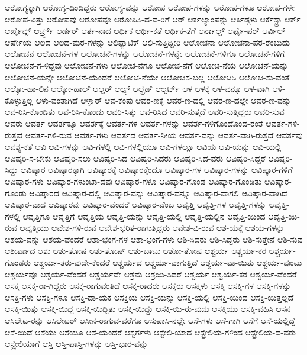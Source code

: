 {ಆರೋಗ್ಯಕ್ಕಾಗಿ
ಆರೋಗ್ಯ-ದಿಂದಿದ್ದರು
ಆರೋಗ್ಯ-ವನ್ನು
ಆರೋಪ
ಆರೋಪ-ಗಳನ್ನು
ಆರೋಪ-ಗಳೂ
ಆರೋಪ-ಗಳೇ
ಆರೋಪ-ವಿತ್ತು
ಆರೋಪವು
ಆರೋಪವೂ
ಆರೋಪಿಸಿ-ದ-ವ-ರಿಗೆ
ಆರ್
ಆರ್ಕಲ್ಯಾಂಪನ್ನು
ಆರ್ಕಿಡ್ಗಳು
ಆರ್ಕೆಸ್ಟ್ರಾ
ಆರ್ಕ್
ಆರ್ಖೈವ್ಸ್
ಆರ್ಚ್ರ್ಡ್
ಆರ್ಡರ್
ಆರ್ತ-ನಾದ
ಆರ್ಥಿಕ
ಆರ್ಥಿ-ಕತೆ
ಆರ್ಥಿಕ-ತೆಗೆ
ಆರ್ನಾಲ್ಡ್
ಆರ್ಫೈ-ಪರ್
ಆರ್ವಿಲ್
ಆರ್ಷೇಯ
ಆಲದ
ಆಲದ-ಮರ-ಗಳನ್ನು
ಆಲಿಫ್ಯಾಟಿಕ್
ಆಲಿ-ಸುತ್ತಿದ್ದೀರಿ
ಆಲೋಚನಾ
ಆಲೋಚನಾ-ಪರ-ರೆಂಬುದು
ಆಲೋಚನೆ
ಆಲೋಚನೆ-ಗಳ
ಆಲೋಚನೆ-ಗಳನ್ನು
ಆಲೋಚನೆ-ಗಳನ್ನೇ
ಆಲೋಚನೆ-ಗಳಿಗೂ
ಆಲೋಚನೆ-ಗಳಿಗೆ
ಆಲೋಚನೆ-ಗ-ಳಿದ್ದವು
ಆಲೋಚನೆ-ಗಳು
ಆಲೋಚ-ನೆಗೂ
ಆಲೋಚ-ನೆಗೆ
ಆಲೋಚ-ನೆಯ
ಆಲೋಚನೆ-ಯನ್ನು
ಆಲೋಚನೆ-ಯನ್ನೇ
ಆಲೋಚನೆ-ಯೆಂದರೆ
ಆಲೋಚ-ನೆಯೇ
ಆಲೋಚಿಸ-ಬಲ್ಲ
ಆಲೋಚಿಸಿ
ಆಲೋಚಿ-ಸು-ವಂತೆ
ಆಲ್ಕೋ-ಹಾ-ಲಿನ
ಆಲ್ಕೋ-ಹಾಲ್
ಆಲ್ಡರ್
ಆಲ್ಪ್ಸ್
ಆಲ್ಫ್ರೆಡ್
ಆಲ್ಬರ್ಟ್
ಆಳ
ಆಳಕ್ಕೆ
ಆಳ-ವನ್ನೂ
ಆಳ-ವಾಗಿ
ಆಳಿ-ಕೊಳ್ಳುತ್ತಿಲ್ಲ
ಆಳು-ವಂತಾಗಿದೆ
ಆಳ್ವಾರ್
ಆವ-ಕೆಂಪು
ಆವರ-ಣಕ್ಕೆ
ಆವರ-ಣ-ದಲ್ಲಿ
ಆವರ-ಣ-ದಲ್ಲೇ
ಆವರ-ಣ-ವನ್ನು
ಆವ-ರಿಸಿ-ಕೊಂಡಿತು
ಆವ-ರಿಸಿ-ಕೊಂಡು
ಆವರಿ-ಸಿತ್ತು
ಆವ-ರಿಸಿದ
ಆವರಿ-ಸುತ್ತದೆ
ಆವರಿ-ಸುತ್ತಿದ್ದರು
ಆವರಿ-ಸುವ
ಆವರು
ಆವರ್ತ
ಆವರ್ತಕ್ಕೂ
ಆವರ್ತಕ್ಕೆ
ಆವರ್ತ-ಗಳ
ಆವರ್ತ-ಗಳನ್ನು
ಆವರ್ತ-ಗಳಿಗೊಂದೊಂದ-ರಂತೆ
ಆವರ್ತ-ಗಳಿ-ರುತ್ತವೆ
ಆವರ್ತ-ಗಳಿ-ರುವ
ಆವರ್ತ-ಗಳು
ಆವರ್ತದ
ಆವರ್ತ-ನೀಯ
ಆವರ್ತ-ವನ್ನು
ಆವರ್ತ-ವಾಗಿ-ರುತ್ತದೆ
ಆವರ್ತವು
ಆವಶ್ಯ-ಕತೆ
ಆವಿ
ಆವಿ-ಗಳನ್ನು
ಆವಿ-ಗಳಲ್ಲಿ
ಆವಿ-ಗಳಲ್ಲಿಯೂ
ಆವಿ-ಗಳಲ್ಲೂ
ಆವಿಯ
ಆವಿ-ಯನ್ನು
ಆವಿ-ಯಲ್ಲಿ
ಆವಿಷ್ಕರಿ-ಸ-ಬೇಕು
ಆವಿಷ್ಕರಿ-ಸಲು
ಆವಿಷ್ಕರಿ-ಸಿದ
ಆವಿಷ್ಕರಿ-ಸಿದರು
ಆವಿಷ್ಕರಿ-ಸಿದ-ವರು
ಆವಿಷ್ಕರಿ-ಸಿದ್ದರೆ
ಆವಿಷ್ಕರಿ-ಸಿದ್ದು
ಆವಿಷ್ಕಾರ
ಆವಿಷ್ಕಾರಕ್ಕಾಗಿ
ಆವಿಷ್ಕಾರಕ್ಕೆ
ಆವಿಷ್ಕಾರಕ್ಕೆಂದೂ
ಆವಿಷ್ಕಾರ-ಗಳ
ಆವಿಷ್ಕಾರ-ಗಳನ್ನು
ಆವಿಷ್ಕಾರ-ಗಳಿಗೆ
ಆವಿಷ್ಕಾರ-ಗಳು
ಆವಿಷ್ಕಾರ-ಗಳುಂಟಾ-ದವು
ಆವಿಷ್ಕಾರ-ಗಳೂ
ಆವಿಷ್ಕಾರ-ಗೊಂಡ
ಆವಿಷ್ಕಾರ-ಗೊಂಡಿತು
ಆವಿಷ್ಕಾರ-ಗೊಂಡು
ಆವಿಷ್ಕಾರದ
ಆವಿಷ್ಕಾರ-ದಲ್ಲಿ
ಆವಿಷ್ಕಾರ-ವನ್ನು
ಆವಿಷ್ಕಾರ-ವನ್ನೂ
ಆವಿಷ್ಕಾರ-ವಾಗಲಿ
ಆವಿಷ್ಕಾರ-ವಾಗಿದೆ
ಆವಿಷ್ಕಾರ-ವಾದ
ಆವಿಷ್ಕಾರವು
ಆವಿಷ್ಕಾರ-ವೆಂದರೆ
ಆವಿಷ್ಕಾರ-ವೆಂಬ
ಆವೃತ್ತಿ
ಆವೃತ್ತಿ-ಗಳ
ಆವೃತ್ತಿ-ಗಳನ್ನು
ಆವೃತ್ತಿ-ಗಳಲ್ಲಿ
ಆವೃತ್ತಿಗೂ
ಆವೃತ್ತಿಗೆ
ಆವೃತ್ತಿಯ
ಆವೃತ್ತಿ-ಯನ್ನು
ಆವೃತ್ತಿ-ಯಲ್ಲಿ
ಆವೃತ್ತಿ-ಯಲ್ಲಿನ
ಆವೃತ್ತಿ-ಯಿಂದ
ಆವೃತ್ತಿ-ಯಿ-ರುವ
ಆವೃತ್ತಿಯು
ಆವೇಶ-ಗಳಿ-ರುವ
ಆವೇಶ-ಭರಿತ-ರಾಗುತ್ತಿದ್ದರು
ಆವೇಶ-ವಿ-ರುವ
ಆಶ-ಯಕ್ಕೆ
ಆಶಯ-ಗಳನ್ನು
ಆಶಯ-ವನ್ನು
ಆಶಯ-ವೆಂದರೆ
ಆಶಾ-ಭಂಗ-ಗಳ
ಆಶಾ-ಭಂಗ-ಗಳು
ಆಶಿ-ಸಿದರು
ಆಶಿ-ಸಿದ್ದರು
ಆಶಿ-ಸುತ್ತೇನೆ
ಆಶಿ-ಸುವ
ಆಶೀರ್ವಾದ
ಆಶು
ಆಶು-ತೋಷ
ಆಶು-ತೋಷ್
ಆಶು-ಬಾಬು
ಆಶೋ-ತೋಷ
ಆಶ್ಚರ್ಯ
ಆಶ್ಚರ್ಯ-ಕರ
ಆಶ್ಚರ್ಯ-ಗೊಂಡರು
ಆಶ್ಚರ್ಯ-ತರು-ವುದೇ-ಕೆಂದರೆ
ಆಶ್ಚರ್ಯದ
ಆಶ್ಚರ್ಯ-ವಾಗುತ್ತಿದೆ
ಆಶ್ಚರ್ಯ-ವಾ-ಯಿತು
ಆಶ್ಚರ್ಯ-ವುಂಟು
ಆಶ್ಚರ್ಯವೂ
ಆಶ್ಚರ್ಯ-ವೆಂದರೆ
ಆಶ್ಚರ್ಯವೇ
ಆಶ್ರಮ
ಆಶ್ರಯಿ-ಸಿದರೆ
ಆಶ್ವರ್ಯ
ಆಶ್ವರ್ಯ-ಕರ
ಆಶ್ವರ್ಯ-ವೆಂದರೆ
ಆಸಕ್ತ
ಆಸಕ್ತ-ರಾ-ಗಿದ್ದರು
ಆಸಕ್ತ-ರಾಗುವಂತಿದೆ
ಆಸಕ್ತ-ರಾದರು
ಆಸಕ್ತರು
ಆಸಕ್ತಳು
ಆಸಕ್ತಿ
ಆಸಕ್ತಿ-ಗಳ
ಆಸಕ್ತಿ-ಗಳನ್ನು
ಆಸಕ್ತಿ-ಗಳು
ಆಸಕ್ತಿ-ಗಳೂ
ಆಸಕ್ತಿ-ದಾ-ಯಕ
ಆಸಕ್ತಿಯ
ಆಸಕ್ತಿ-ಯನ್ನು
ಆಸಕ್ತಿ-ಯಲ್ಲಿ
ಆಸಕ್ತಿ-ಯಿಂದ
ಆಸಕ್ತಿ-ಯಿತ್ತಲ್ಲದೆ
ಆಸಕ್ತಿ-ಯಿತ್ತು
ಆಸಕ್ತಿ-ಯಿದ್ದ
ಆಸಕ್ತಿ-ಯಿದ್ದಿತು
ಆಸಕ್ತಿ-ಯಿದ್ದು
ಆಸಕ್ತಿ-ಯಿ-ರು-ವುದು
ಆಸಕ್ತಿಯು
ಆಸಕ್ತಿ-ವಹಿಸಿ
ಆಸನ
ಆಸಿಲೇಟ-ರನ್ನು
ಆಸಿಲೇಟರ್
ಆಸೀನ-ರಾಗುವ-ವರೆಗೂ
ಆಸುಪಾಸಿ-ನಲ್ಲೇ
ಆಸೆ-ಗಳು
ಆಸೆ-ಗಾಗಿ
ಆಸೆಗೆ
ಆಸೆ-ಯಲ್ಲಿದ್ದೆ
ಆಸೆ-ಯಿದೆ
ಆಸೆಯು
ಆಸೆಯೂ
ಆಸೆ-ಯೆಂದರೆ
ಆಸ್ಟರ್ಗಳು
ಆಸ್ಟೇಲಿ-ಯಾದ
ಆಸ್ಟ್ರೇಲಿಯ-ಗಳಿಂದ
ಆಸ್ಟ್ರೇಲಿಯ-ದ-ವರು
ಆಸ್ಟ್ರೇಲಿಯಾಗೆ
ಆಸ್ತಿ
ಆಸ್ತಿ-ಪಾಸ್ತಿ-ಗಳನ್ನು
ಆಸ್ತಿ-ಭಾರ-ವನ್ನು
}
